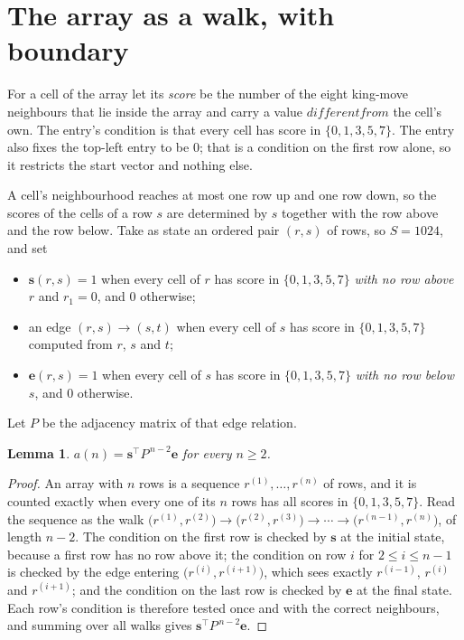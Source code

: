 \documentclass[11pt,a4paper]{article}
\theoremstyle{plain}
\newtheorem{lemma}[theorem]{Lemma}
\theoremstyle{definition}
\begin{document}
\section{The array as a walk, with boundary}

For a cell of the array let its \emph{score} be the number of the eight king-move neighbours that lie inside
the array and carry a value $different from$ the cell's own. The entry's condition is that every cell
has score in $\{0,1,3,5,7\}$. The entry also fixes the top-left entry to be $0$; that is a condition on the first row alone, so it restricts the start vector and nothing else.

A cell's neighbourhood reaches at most one row up and one row down, so the scores of the
cells of a row $s$ are determined by $s$ together with the row above and the row below.
Take as state an ordered pair $(r,s)$ of rows, so $S=1024$, and set
\begin{itemize}
\item $\mathbf{s}(r,s)=1$ when every cell of $r$ has score in $\{0,1,3,5,7\}$ \emph{with no row
above $r$} and $r_1=0$, and $0$ otherwise;
\item an edge $(r,s)\to(s,t)$ when every cell of $s$ has score in $\{0,1,3,5,7\}$ computed from
$r$, $s$ and $t$;
\item $\mathbf{e}(r,s)=1$ when every cell of $s$ has score in $\{0,1,3,5,7\}$ \emph{with no row
below $s$}, and $0$ otherwise.
\end{itemize}
Let $P$ be the adjacency matrix of that edge relation.

\begin{lemma}\label{lem:walk}
$a(n)=\mathbf{s}^{\!\top}P^{\,n-2}\mathbf{e}$ for every $n\ge2$.
\end{lemma}

\begin{proof}
An array with $n$ rows is a sequence $r^{(1)},\dots,r^{(n)}$ of rows, and it is counted
exactly when every one of its $n$ rows has all scores in $\{0,1,3,5,7\}$. Read the sequence as the
walk $\bigl(r^{(1)},r^{(2)}\bigr)\to\bigl(r^{(2)},r^{(3)}\bigr)\to\cdots\to
\bigl(r^{(n-1)},r^{(n)}\bigr)$, of length $n-2$. The condition on the first row is
checked by $\mathbf{s}$ at the initial state, because a first row has no row above it; the
condition on row $i$ for $2\le i\le n-1$ is checked by the edge entering
$\bigl(r^{(i)},r^{(i+1)}\bigr)$, which sees exactly $r^{(i-1)}$, $r^{(i)}$ and
$r^{(i+1)}$; and the condition on the last row is checked by $\mathbf{e}$ at the final
state. Each row's condition is therefore tested once and with the correct neighbours, and
summing over all walks gives $\mathbf{s}^{\!\top}P^{\,n-2}\mathbf{e}$.
\end{proof}
\end{document}
